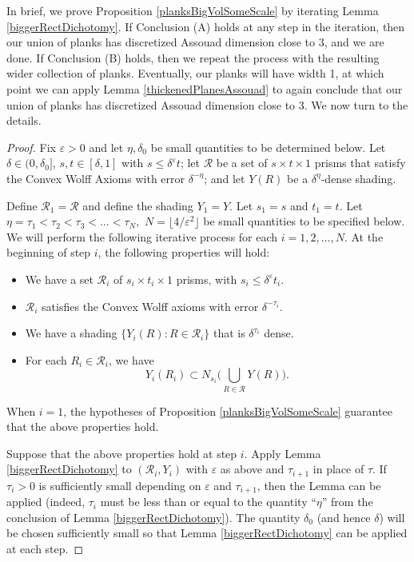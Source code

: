 \documentclass[letterpaper, reqno,11pt]{article}
\numberwithin{equation}{section}
\newcommand{\eps}{\varepsilon}
\numberwithin{thm}{section}
\theoremstyle{remark}
\begin{document}
In brief, we prove Proposition \ref{planksBigVolSomeScale} by iterating Lemma \ref{biggerRectDichotomy}. If Conclusion (A) holds at any step in the iteration, then our union of planks has discretized Assouad dimension close to 3, and we are done. If Conclusion (B) holds, then we repeat the process with the resulting wider collection of planks. Eventually, our planks will have width 1, at which point we can apply Lemma \ref{thickenedPlanesAssouad} to again conclude that our union of planks has discretized Assouad dimension close to 3. We now turn to the details.


\begin{proof}
Fix $\eps>0$ and let $\eta,\delta_0$ be small quantities to be determined below. Let $\delta\in(0,\delta_0]$, $s,t\in[\delta,1]$ with $s\leq\delta^{\eps}t$; let $\mathcal{R}$ be a set of $s\times t\times 1$ prisms that satisfy the Convex Wolff Axioms with error $\delta^{-\eta}$; and let $Y(R)$ be a $\delta^{\eta}$-dense shading.

Define $\mathcal{R}_1 = \mathcal{R}$ and define the shading $Y_1=Y$. Let $s_1=s$ and $t_1=t$. Let  $\eta=\tau_1<\tau_2<\tau_3<\ldots<\tau_N,$ $N = \lfloor 4/\eps^2\rfloor$ be small quantities to be specified below. We will perform the following iterative process for each $i=1,2,\ldots,N$. At the beginning of step $i$, the following properties will hold:
\begin{itemize}
\item[(a)] We have a set $\mathcal{R}_i$ of $s_i\times t_i\times 1$ prisms, with $s_i\leq \delta^{\eps}t_i$.
\item[(b)] $\mathcal{R}_i$ satisfies the Convex Wolff axioms with error $\delta^{-\tau_{i}}$.
\item[(c)] We have a shading $\{Y_i(R)\colon R\in\mathcal{R}_i\}$ that is $\delta^{\tau_{i}}$ dense.
\item[(d)] For each $R_i\in\mathcal{R}_i$, we have 
\begin{equation}\label{shadingRiProperty}
Y_i(R_i)\subset N_{s_i}\Big(\bigcup_{R\in\mathcal{R}}Y(R)\Big).
\end{equation}
\end{itemize}
When $i=1$, the hypotheses of Proposition \ref{planksBigVolSomeScale} guarantee that the above properties hold.

Suppose that the above properties hold at step $i$. Apply Lemma \ref{biggerRectDichotomy} to $(\mathcal{R}_i, Y_i)$ with $\eps$ as above and $\tau_{i+1}$ in place of $\tau$. If $\tau_i>0$ is sufficiently small depending on $\eps$ and $\tau_{i+1}$, then the Lemma can be applied (indeed, $\tau_i$ must be less than or equal to the quantity ``$\eta$'' from the conclusion of Lemma \ref{biggerRectDichotomy}). The quantity $\delta_0$ (and hence $\delta$) will be chosen sufficiently small so that Lemma \ref{biggerRectDichotomy} can be applied at each step.


\end{proof}
\end{document}
